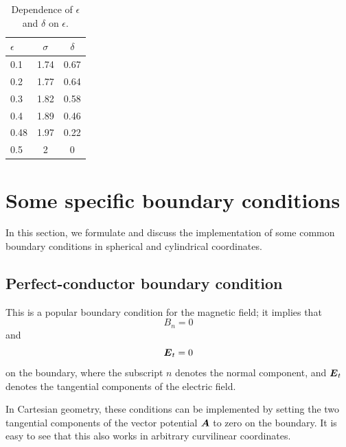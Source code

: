 \documentclass[\mydriver,12pt,twoside,notitlepage,a4paper]{article}
\renewcommand{\vec}[1]{\mbox{\boldmath{$#1$}}}
\begin{document}
\begin{table}[htb]
  \begin{center}
    \caption{
      Dependence of $\epsilon$ and $\delta$ on $\epsilon$.
    }
    \label{Tplanetsoltn}
    \begin{tabular}{lcc}
    \toprule
$\epsilon$ & $\sigma$ & $\delta$ \\
    \midrule
 0.1 & 1.74 & 0.67 \\
 0.2 & 1.77 & 0.64 \\
 0.3 & 1.82 & 0.58 \\
 0.4 & 1.89 & 0.46 \\
 0.48& 1.97 & 0.22 \\
 0.5 &  2   &  0   \\
    \bottomrule
    \end{tabular}
  \end{center}
\end{table}


\section{Some specific boundary conditions}
\label{s-boundary-conditions}

In this section, we formulate and discuss the implementation of some
common boundary conditions in spherical and cylindrical coordinates.

\subsection{Perfect-conductor boundary condition}

This is a popular boundary condition for the magnetic field; it implies that
\begin{equation}
  \label{Eq-boundcond-perfcond-1}
  B_n = 0
\end{equation}
and
\begin{equation}
  \vec{E}_t = 0
\end{equation}
on the boundary, where the subscript $n$ denotes the normal component, and
$\vec{E}_t$ denotes the tangential components of the electric field.

In Cartesian geometry, these conditions can be implemented by setting
the two tangential components of the vector potential $\vec{A}$ to zero
on the boundary.
It is easy to see that this also works in arbitrary curvilinear
coordinates.
\end{document}
